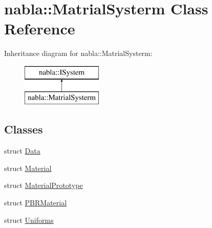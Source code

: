 \hypertarget{classnabla_1_1_matrial_systerm}{}\section{nabla\+::Matrial\+Systerm Class Reference}
\label{classnabla_1_1_matrial_systerm}
Inheritance diagram for nabla\+::Matrial\+Systerm\+:\begin{figure}[H]
\begin{center}
\leavevmode
\includegraphics[height=2.000000cm]{classnabla_1_1_matrial_systerm}
\end{center}
\end{figure}
\subsection*{Classes}
\begin{DoxyCompactItemize}
\item 
struct \mbox{\hyperlink{structnabla_1_1_matrial_systerm_1_1_data}{Data}}
\item 
struct \mbox{\hyperlink{structnabla_1_1_matrial_systerm_1_1_material}{Material}}
\item 
struct \mbox{\hyperlink{structnabla_1_1_matrial_systerm_1_1_material_prototype}{Material\+Prototype}}
\item 
struct \mbox{\hyperlink{structnabla_1_1_matrial_systerm_1_1_p_b_r_material}{P\+B\+R\+Material}}
\item 
struct \mbox{\hyperlink{structnabla_1_1_matrial_systerm_1_1_uniforms}{Uniforms}}
\end{DoxyCompactItemize}
